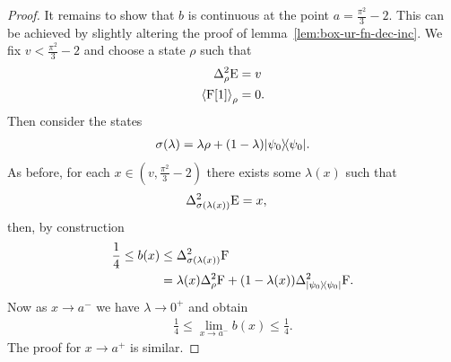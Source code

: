\begin{proof}
It remains to show that $b$ is continuous at the point $a=\frac{\pi^2}{3}-2$. This can be achieved by slightly altering the proof of lemma~\ref{lem:box-ur-fn-dec-inc}. We fix $v < \frac{\pi^2}{3}-2$ and choose a state $\rho$ such that
\begin{align}
  \var[\rho]{\ope} &= v\\
  \expe{\opf[1]}{\rho} &= 0.
\end{align} 
Then consider the states
\begin{align}
  \sigma(\lambda) = \lambda\rho + (1-\lambda)|\psi_0\rangle\!\langle\psi_0|.
\end{align}
As before, for each $x\in \left(v,\frac{\pi^2}{3}-2\right)$ there exists some $\lambda(x)$ such that 
\begin{align}
  \var[\sigma(\lambda(x))]{\ope} &= x,
\end{align}
then, by construction
\begin{align}
  \frac{1}{4} \leq b(x) &\leq \var[\sigma(\lambda(x))]{\opf}\\
                        &= \lambda(x)\var[\rho]{\opf} + (1-\lambda(x))\var[\ketbra{\psi_0}{\psi_0}]{\opf}.
\end{align}
Now as $x\to a^-$ we have $\lambda\to 0^+$ and obtain
\begin{align}
  \frac{1}{4} \leq \lim_{x\to a^-} b(x) \leq \frac{1}{4}.
\end{align}
The proof for $x\to a^+$ is similar.
\end{proof}

